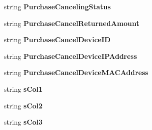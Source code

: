 \begin{DoxyCompactItemize}
\item 
string {\bfseries Purchase\+Canceling\+Status}\hypertarget{a00066_a6463d3d9eea619442cf4ca9fe28216d2}{}\label{a00066_a6463d3d9eea619442cf4ca9fe28216d2}

\item 
string {\bfseries Purchase\+Cancel\+Returned\+Amount}\hypertarget{a00066_acb5f124bdd4a054b915a6b30541d3594}{}\label{a00066_acb5f124bdd4a054b915a6b30541d3594}

\item 
string {\bfseries Purchase\+Cancel\+Device\+ID}\hypertarget{a00066_adfe40e49e594014b9eecaa95285bb35a}{}\label{a00066_adfe40e49e594014b9eecaa95285bb35a}

\item 
string {\bfseries Purchase\+Cancel\+Device\+I\+P\+Address}\hypertarget{a00066_a0dea2555742796bbc48a7d29cc55307a}{}\label{a00066_a0dea2555742796bbc48a7d29cc55307a}

\item 
string {\bfseries Purchase\+Cancel\+Device\+M\+A\+C\+Address}\hypertarget{a00066_aab8c6f9826f23812a593d66182c0e944}{}\label{a00066_aab8c6f9826f23812a593d66182c0e944}

\item 
string {\bfseries s\+Col1}\hypertarget{a00066_af0a85bb72dd8d9bd248fc10c301d01d2}{}\label{a00066_af0a85bb72dd8d9bd248fc10c301d01d2}

\item 
string {\bfseries s\+Col2}\hypertarget{a00066_ad2d4029c33932ed8b437488dd73e0c6c}{}\label{a00066_ad2d4029c33932ed8b437488dd73e0c6c}

\item 
string {\bfseries s\+Col3}\hypertarget{a00066_a84015b48894633bd6695ffd997d247d5}{}\label{a00066_a84015b48894633bd6695ffd997d247d5}


\end{DoxyCompactItemize}
